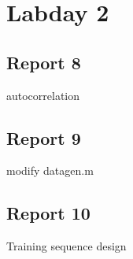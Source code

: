 \documentclass[11pt,titlepage]{report}
\begin{document}
\section{Labday 2}
\subsection{Report 8}
autocorrelation

\subsection{Report 9}
modify datagen.m

\subsection{Report 10}
Training sequence design
\end{document}
